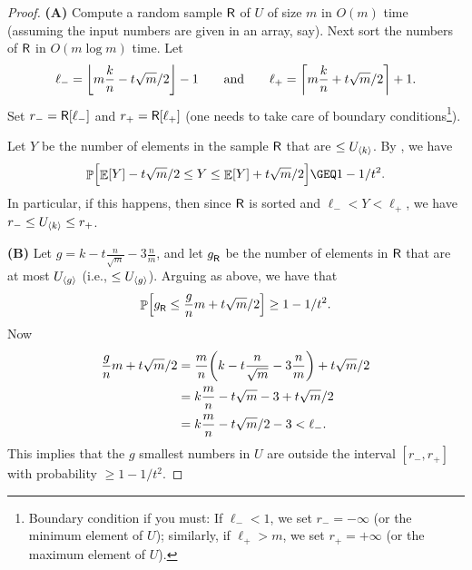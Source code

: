 \begin{proof}
    \textbf{(A)} Compute a random sample $\mathsf{R}$ of $U$ of size $m$
    in $O(m)$ time (assuming the input numbers are given in an array,
    say). Next sort the numbers of $\mathsf{R}$ in $O( m \log m)$
    time. Let
    \begin{equation*}
        \ell_{-} = \floor{m \frac{k}{n} - t \sqrt{m}/2 }-1
        \qquad \text{and} \qquad%
        \ell_{+} = \ceil{m \frac{k}{n} + t \sqrt{m}/2 }+1.
    \end{equation*}
    Set $r_{-} = \mathsf{R}[ \ell_{-}]$ and $r_+ = \mathsf{R}[ \ell_{+}]$ (one needs
    to take care of boundary conditions\footnote{Boundary condition if
       you must: If $\ell_- < 1$, we set $r_- = -\infty$ (or the minimum element
       of $U$); similarly, if $\ell_+ > m$, we set $r_+ = +\infty$ (or the
       maximum element of $U$).}).

    Let $Y$ be the number of elements in the sample $\mathsf{R}$ that are
    $\leq U_{\langle k\rangle}$.  By , we have
    \begin{equation*}
        \ds%
        \Prob{\Bigl. \Ex{Y} - t \sqrt{m}/2 \leq Y \leq \Ex{Y} + t \sqrt{m}/2
        }
        \GEQ
        1- {1}/{t^2}.
    \end{equation*}
    In particular, if this happens, then since $\mathsf{R}$ is sorted and
    $\ell_- < Y < \ell_+$, we have $r_- \leq U_{\langle k\rangle} \leq r_+$. %

    \bigskip%
    \noindent
    \textbf{(B)} Let $g= k - t \frac{n}{\sqrt{m}} -3\frac{n}{m}$, and let
    $g^{}_{\mathsf{R}}$ be the number of elements in $\mathsf{R}$ that are at
    most $U_{\langle g\rangle}$ (i.e., $\leq U_{\langle g\rangle}$). Arguing as above, we
    have that
    \begin{equation*}
        \Prob{ g^{}_\Sample \leq \frac{g}{n} m + t \sqrt{m}/2 } \geq
        1- {1}/{t^2}.
    \end{equation*}
    Now
    \begin{align*}
      \frac{g}{n} m + t \sqrt{m}/2 %
      &=
      \frac{m}{n}\pth{
      k - t \frac{n}{\sqrt{m}} -3\frac{n}{m} }  +  t \sqrt{m}/2
      \\&=
      k \frac{m}{n} - t \sqrt{m}  -3 +  t \sqrt{m}/2
      \\&=
      k \frac{m}{n} - t \sqrt{m}/2  -3
      < \ell_{-}.
    \end{align*}
    This implies that the $g$ smallest numbers in $U$ are outside the
    interval $[r_-,r_+]$ with probability $\geq 1-1/t^2$.


\end{proof}

